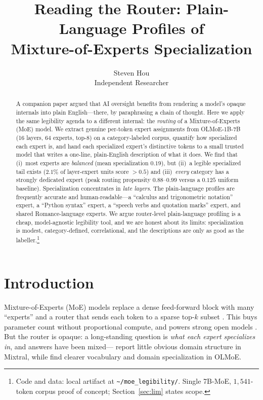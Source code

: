 \documentclass{article}
\title{Reading the Router: Plain-Language Profiles of\\
Mixture-of-Experts Specialization}
\author{%
  Steven Hou\\
  Independent Researcher}
\begin{document}
\maketitle

\begin{abstract}
\noindent
A companion paper argued that AI oversight benefits from rendering a model's
opaque internals into plain English---there, by paraphrasing a chain of thought.
Here we apply the same legibility agenda to a different internal: the
\emph{routing} of a Mixture-of-Experts (MoE) model. We extract genuine per-token
expert assignments from OLMoE-1B-7B (16 layers, 64 experts, top-8) on a
category-labeled corpus, quantify how specialized each expert is, and hand each
specialized expert's distinctive tokens to a small trusted model that writes a
one-line, plain-English description of what it does. We find that (i)~most experts
are \emph{balanced} (mean specialization $0.19$), but (ii)~a legible specialized
tail exists ($2.1\%$ of layer-expert units score $>0.5$) and (iii)~\emph{every}
category has a strongly dedicated expert (peak routing propensity $0.88$--$0.99$
versus a $0.125$ uniform baseline). Specialization concentrates in \emph{late
layers}. The plain-language profiles are frequently accurate and human-readable---a
``calculus and trigonometric notation'' expert, a ``Python syntax'' expert, a
``speech verbs and quotation marks'' expert, and shared Romance-language experts.
We argue router-level plain-language profiling is a cheap, model-agnostic
legibility tool, and we are honest about its limits: specialization is modest,
category-defined, correlational, and the descriptions are only as good as the
labeller.\footnote{Code and data: local artifact at
\texttt{\textasciitilde/moe\_legibility/}. Single 7B-MoE, $1{,}541$-token corpus
proof of concept; Section~\ref{sec:lim} states scope.}
\end{abstract}

\section{Introduction}
Mixture-of-Experts (MoE) models replace a dense feed-forward block with many
``experts'' and a router that sends each token to a sparse top-$k$ subset
\citep{shazeer2017moe,fedus2022switch}. This buys parameter count without
proportional compute, and powers strong open models \citep{jiang2024mixtral,
muennighoff2024olmoe}. But the router is opaque: a long-standing question is
\emph{what each expert specializes in}, and answers have been mixed---\citet{jiang2024mixtral}
report little obvious domain structure in Mixtral, while \citet{muennighoff2024olmoe}
find clearer vocabulary and domain specialization in OLMoE.
\end{document}
